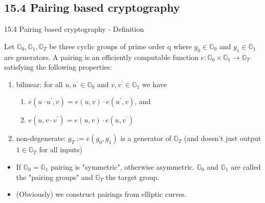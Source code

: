 \documentclass[aspectratio=169,xcolor=dvipsnames]{beamer}
\newcommand{\Go}{\mathbb{G}_0}
\newcommand{\Gi}{\mathbb{G}_1}
\newcommand{\Gt}{\mathbb{G}_T}
\begin{document}
\subsection{15.4 Pairing based cryptography}
    \begin{frame}{15.4 Pairing based cryptography - Definition}
    \begin{theorem}
        Let $\Go, \Gi, \Gt$ be three cyclic groups of prime order q where $g_0 \in \Go$ and $g_1 \in \Gi$ are generators. A pairing is an efficiently computable function $e : \Go \times \Gi \rightarrow \Gt$ satisfying the following properties:
        \begin{enumerate}
            \item bilinear: for all $u, u^{'} \in \Go$ and $v, v^{'} \in \Gi$ we have
            \begin{enumerate}
                \item $e(u \cdot u^{'}, v) = e(u,v) \cdot e(u^{'}, v)$, and
                \item $e(u, v \cdot v^{'}) = e(u,v) \cdot e(u, v^{'})$
            \end{enumerate}
            \item non-degenerate: $g_T := e(g_0, g_1)$ is a generator of $\Gt$ (and doesn't just output $1 \in \Gt$ for all inputs) 
            
        \end{enumerate}
    \end{theorem}
    \begin{itemize}
        \item If $\Go = \Gi$ pairing is "symmetric", otherwise asymmetric. $\Go$ and $\Gi$ are called the "pairing groups" and $\Gt$ the target group.
        \item (Obviously) we construct pairings from elliptic curves.
    \end{itemize}
    \end{frame}
\end{document}
